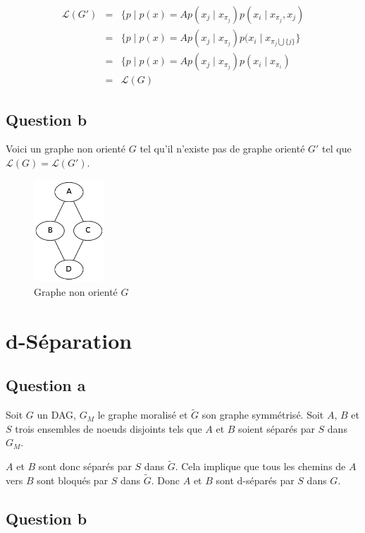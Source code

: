 \documentclass{article}
\begin{document}
\begin{align}
\mathcal{L}(G') & = & \{ p \mid p(x) = A p(x_j \mid x_{\pi_j}) p(x_i \mid x_{\pi_j}, x_j) \\
	        & = & \{ p \mid p(x) = A p(x_j \mid x_{\pi_j}) p(x_i \mid x_{\pi_j \bigcup \{j\}} \} \\
		& = & \{ p \mid p(x) = A p(x_j \mid x_{\pi_j}) p(x_i \mid x_{\pi_i}) \\
		& = & \mathcal{L}(G)
\end{align}


\subsection{Question b}
Voici un graphe non orienté $G$ tel qu'il n'existe pas de graphe orienté $G'$ tel que $\mathcal{L}(G) = \mathcal{L}(G')$.

\begin{figure}[h]
\caption{Graphe non orienté $G$}
\includegraphics[width=100px]{Ia.png}
\end{figure}

\section{d-Séparation}

\subsection{Question a}

Soit $G$ un DAG, $G_M$ le graphe moralisé et $\tilde{G}$ son graphe symmétrisé. Soit
$A$, $B$ et $S$ trois ensembles de noeuds disjoints tels que $A$ et $B$ soient
séparés par $S$ dans $G_M$.

$A$ et $B$ sont donc séparés par $S$ dans $\tilde{G}$. Cela implique que tous
les chemins de $A$ vers $B$ sont bloqués par $S$ dans $\tilde{G}$. Donc $A$ et
$B$ sont d-séparés par $S$ dans $G$.


\subsection{Question b}
\end{document}
